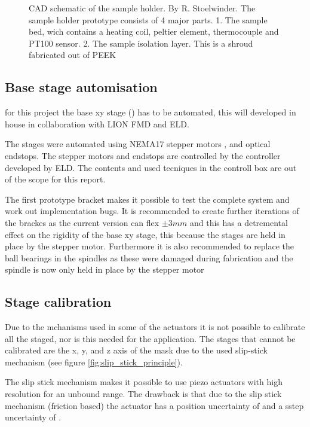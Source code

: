 \documentclass[11pt]{article}
\begin{document}
\begin{figure}[H]
\begin{minipage}[b]{0.45\textwidth}
    \caption{CAD schematic of the sample holder. By R. Stoelwinder. The sample holder prototype consists of 4 major parts. 1. The sample bed, wich contains a heating coil, peltier element, thermocouple and PT100 sensor. 2. The sample isolation layer. This is a shroud fabricated out of PEEK}
    \label{fig:CAD_sample_holder}
  \end{minipage}
\end{figure}

\subsection{Base stage automisation}


for this project the base xy stage () has to be automated, this will developed in house in collaboration with LION FMD and ELD. 

The stages were automated using NEMA17 stepper motors , and optical endstops.
The stepper motors and endstops are controlled by the controller developed by ELD.
The contents and used tecniques in the controll box are out of the scope for this report.

The first prototype bracket makes it possible to test the complete system and work out implementation bugs. 
It is recommended to create further iterations of the brackes as the current version can flex $\pm 3mm$ and this has a detremental effect on the rigidity of the base xy stage, this because the stages are held in place by the stepper motor. 
Furthermore it is also recommended to replace the ball bearings in the spindles as these were damaged during fabrication and the spindle is now only held in place by the stepper motor

\subsection{Stage calibration}
Due to the mchanisms used in some of the actuators it is not possible to calibrate all the staged,
nor is this needed for the application. 
The stages that cannot be calibrated are the x, y, and z axis of the mask due to the used slip-stick mechanism (see figure \ref{fig:slip_stick_principle}). 

The slip stick mechanism makes it possible to use piezo actuators with high resolution for an unbound range.
The drawback is that due to the slip stick mechanism (friction based) the actuator has a position uncertainty of  and a sstep uncertainty of .
\end{document}

